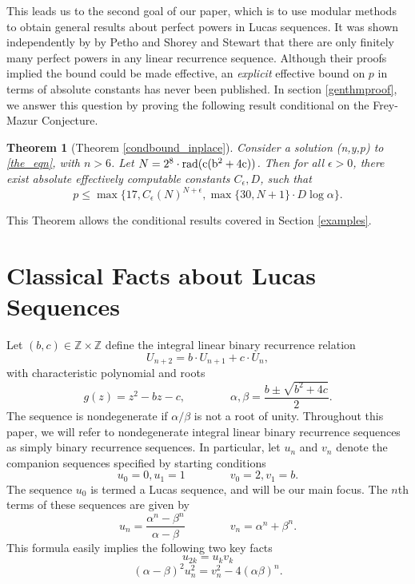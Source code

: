 \documentclass[12pt]{amsart}
\newtheorem{ithm}{Theorem}
\theoremstyle{definition}
\def\Z{{\mathbb Z}}
\newcommand{\rad}{\rm rad}
\begin{document}
This leads us to the second goal of our paper, which is to use modular methods to obtain general results about perfect powers in Lucas sequences. It was shown independently by by Petho \cite{petho82} and Shorey and Stewart \cite{shorey83} that there are only finitely many perfect powers in any linear recurrence sequence.  Although their proofs implied the bound could be made effective, an \emph{explicit} effective bound on $p$ in terms of absolute constants has never been published.  In section \ref{genthmproof}, we answer this question by proving the following result conditional on the Frey-Mazur Conjecture.

\begin{ithm}[Theorem \ref{condbound_inplace}]\label{condbound}
Consider a solution (n,y,p) to \eqref{the_eqn}, with $n > 6$. Let $N = 2^8 \cdot \rad(c(b^2+4c))$. Then for all $\epsilon > 0$, there exist absolute effectively computable constants $C_{\epsilon}, D$, such that
\[ p \leq \max\{17, C_{\epsilon} \left( N \right)^{N + \epsilon}, \max\{30, N+1\} \cdot D\log{\alpha} \}. \]
\end{ithm}
This Theorem allows the conditional results covered in Section \ref{examples}.

\section{Classical Facts about Lucas Sequences}\label{classicalresults}


Let $(b,c) \in \Z \times \Z$ define the integral linear binary recurrence relation
\[ U_{n+2} = b\cdot U_{n+1}+ c\cdot U_n, \]
with characteristic polynomial and roots
\[ g(z) = z^2 - bz - c, \qquad \qquad \alpha, \beta = \frac{b \pm \sqrt{b^2+4c}}{2}.\]
The sequence is nondegenerate if $\alpha/\beta$ is not a root of unity.  Throughout this paper, we will refer to nondegenerate integral linear binary recurrence sequences as simply binary recurrence sequences.  In particular, let $u_n$ and $v_n$ denote the companion sequences specified by starting conditions
\[ u_0 = 0, u_1 = 1 \qquad \qquad v_0 = 2, v_1 = b .\]
The sequence $u_0$ is termed a Lucas sequence, and will be our main focus.  The $n$th terms of these sequences are given by 
\begin{equation}\label{binetform} u_n = \frac{\alpha^n - \beta^n}{\alpha - \beta} \qquad \qquad v_n = \alpha^n +\beta^n. \end{equation}
This formula easily implies the following two key facts
\begin{equation}\label{fib2} u_{2k} = u_kv_k \end{equation}
\begin{equation}\label{gen_diophan}(\alpha - \beta)^2u_n^2 = v_n^2 - 4(\alpha\beta)^n. \end{equation}
\end{document}

